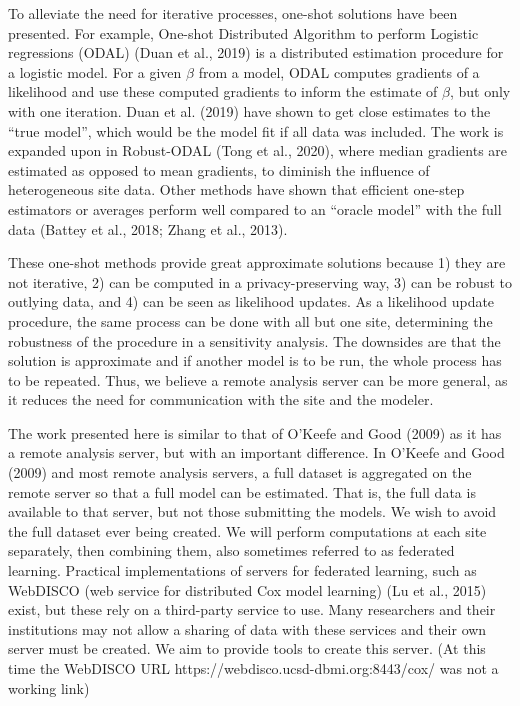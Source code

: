 \documentclass[]{elsarticle} %
\begin{document}
To alleviate the need for iterative processes, one-shot solutions have been presented. For example, One-shot Distributed Algorithm to perform Logistic regressions (ODAL) (Duan et al., 2019) is a distributed estimation procedure for a logistic model. For a given \(\beta\) from a model, ODAL computes gradients of a likelihood and use these computed gradients to inform the estimate of \(\beta\), but only with one iteration. Duan et al. (2019) have shown to get close estimates to the ``true model'', which would be the model fit if all data was included. The work is expanded upon in Robust-ODAL (Tong et al., 2020), where median gradients are estimated as opposed to mean gradients, to diminish the influence of heterogeneous site data. Other methods have shown that efficient one-step estimators or averages perform well compared to an ``oracle model'' with the full data (Battey et al., 2018; Zhang et al., 2013).

These one-shot methods provide great approximate solutions because 1) they are not iterative, 2) can be computed in a privacy-preserving way, 3) can be robust to outlying data, and 4) can be seen as likelihood updates. As a likelihood update procedure, the same process can be done with all but one site, determining the robustness of the procedure in a sensitivity analysis. The downsides are that the solution is approximate and if another model is to be run, the whole process has to be repeated. Thus, we believe a remote analysis server can be more general, as it reduces the need for communication with the site and the modeler.

The work presented here is similar to that of O'Keefe and Good (2009) as it has a remote analysis server, but with an important difference. In O'Keefe and Good (2009) and most remote analysis servers, a full dataset is aggregated on the remote server so that a full model can be estimated. That is, the full data is available to that server, but not those submitting the models. We wish to avoid the full dataset ever being created. We will perform computations at each site separately, then combining them, also sometimes referred to as federated learning. Practical implementations of servers for federated learning, such as WebDISCO (web service for distributed Cox model learning) (Lu et al., 2015) exist, but these rely on a third-party service to use. Many researchers and their institutions may not allow a sharing of data with these services and their own server must be created. We aim to provide tools to create this server. (At this time the WebDISCO URL https://webdisco.ucsd-dbmi.org:8443/cox/ was not a working link)
\end{document}
